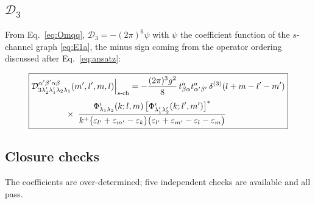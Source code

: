 \documentclass[11pt]{article}
\newcommand{\eps}{\varepsilon}
\newcommand{\dthree}{\delta^{(3)}}
\newcommand{\Ph}{\Phi}
\newcommand{\D}{\mathcal{D}}
\begin{document}
\subsection{$\D_{3}$}
From Eq.~\eqref{eq:Omqq}, $\D_{3}=-(2\pi)^{6}\psi$ with $\psi$ the coefficient function of the $s$-channel graph \eqref{eq:E1a}, the minus sign coming from the operator
ordering discussed after Eq.~\eqref{eq:ansatz}:
\begin{res}
\begin{equation}
\boxed{
\begin{aligned}
&\D^{\alpha'\beta'\alpha\beta}_{3\lambda_{2}'\lambda_{1}'\lambda_{2}\lambda_{1}}(m',l',m,l)
\Big|_{s\text{-ch}}
=-\frac{(2\pi)^{3}g^{2}}{8}\,t^{a}_{\beta\alpha}t^{a}_{\alpha'\beta'}\,\dthree(l+m-l'-m')
\\[3pt]
&\hspace{1.4cm}\times\;
\frac{\Ph^{i}_{\lambda_{1}\lambda_{2}}(k;l,m)\,
\big[\Ph^{i}_{\lambda_{1}'\lambda_{2}'}(k;l',m')\big]^{*}}
{k^{+}\big(\eps_{l'}+\eps_{m'}-\eps_{k}\big)\big(\eps_{l'}+\eps_{m'}-\eps_{l}-\eps_{m}\big)}
\end{aligned}}
\label{eq:D3res}
\end{equation}
\end{res}

\subsection{Closure checks}
\label{sec:checks}

The coefficients are over-determined; five independent checks are available and all pass.
\end{document}
